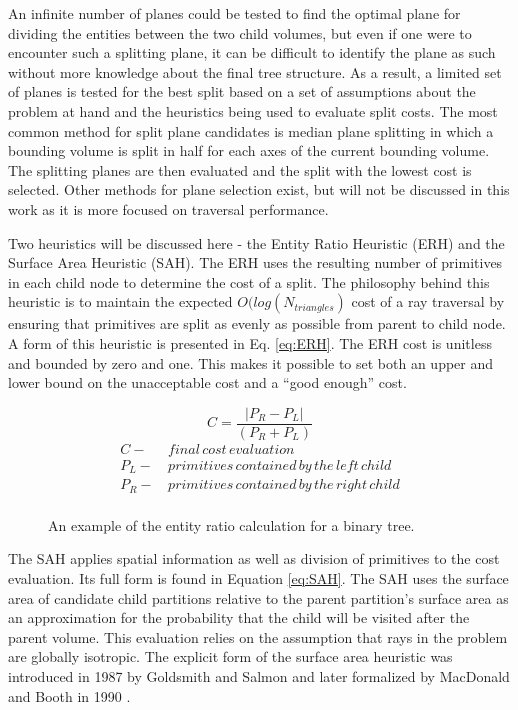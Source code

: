 An infinite number of planes could be tested to find the optimal plane for
dividing the entities between the two child volumes, but even if one were to
encounter such a splitting plane, it can be difficult to identify the plane as
such without more knowledge about the final tree structure. As a result, a
limited set of planes is tested for the best split based on a set of assumptions
about the problem at hand and the heuristics being used to evaluate split
costs. The most common method for split plane candidates is median plane
splitting in which a bounding volume is split in half for each axes of the
current bounding volume. The splitting planes are then evaluated and the split
with the lowest cost is selected. Other methods for plane selection exist, but
will not be discussed in this work as it is more focused on traversal performance.

Two heuristics will be discussed here - the Entity Ratio Heuristic (ERH) and the
Surface Area Heuristic (SAH). The ERH uses the resulting number of
primitives in each child node to determine the cost of a split. The philosophy
behind this heuristic is to maintain the expected $O(log(N_{triangles})$ cost of
a ray traversal by ensuring that primitives are split as evenly as possible from
parent to child node. A form of this heuristic is presented in
Eq. \ref{eq:ERH}. The ERH cost is unitless and bounded by zero and
one. This makes it possible to set both an upper and lower bound on the
unacceptable cost and a ``good enough'' cost.

\begin{figure}[H]
\begin{equation}
\label{eq:ERH}
 C = \frac{|P_{R}-P_{L}|}{(P_{R} + P_{L})} 
\end{equation}
  \begin{align*}
    C - & \,final \, cost \, evaluation \\
    P_{L} - & \, primitives\, contained\, by\, the\, left\, child  \\
    P_{R} - & \, primitives\, contained\, by\, the\, right\, child \\
  \end{align*}
  \caption{An example of the entity ratio calculation for a binary tree.}
  \label{fig:ERH}
\end{figure}

The SAH applies spatial information as well as division of primitives to the
cost evaluation. Its full form is found in Equation \ref{eq:SAH}. The SAH uses
the surface area of candidate child partitions relative to the parent
partition's surface area as an approximation for the probability that the child
will be visited after the parent volume. This evaluation relies on the
assumption that rays in the problem are globally isotropic. The explicit form of
the surface area heuristic was introduced in 1987 by Goldsmith and Salmon
\cite{Goldsmith_1987} and later formalized by MacDonald and Booth in 1990
\cite{MacDonald_1990}.

